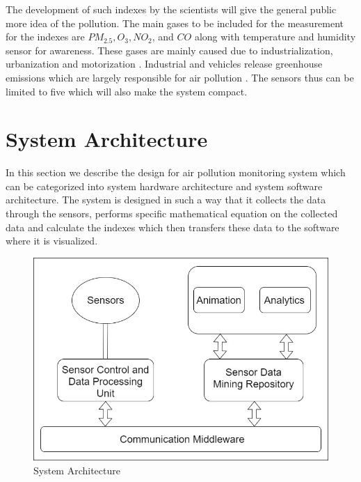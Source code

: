 The development of such indexes by the scientists will give the general public more idea of the pollution. The main gases to be included for the measurement for the indexes are  $PM_{2.5}, O_3, NO_2$, and $CO$ along with temperature and humidity sensor for awareness. These gases are mainly caused due to industrialization, urbanization and motorization \cite{Saha1952}. Industrial and vehicles release greenhouse emissions which are largely responsible for air pollution \cite{ internet}. The sensors thus can be limited to five which will also make the system compact.

\section{System Architecture}
    
     In this section we describe the design for air pollution monitoring system which can be categorized into system hardware architecture and system software architecture. The system is designed in such a way that it collects the data through the sensors, performs specific mathematical equation on the collected data and calculate the indexes which then transfers these data to the software where it is visualized. 

     \begin{figure}[h]
      \begin{center}
      \includegraphics[scale=0.70]{images/figure2.png}
      \end{center}
      \caption{System Architecture}
      \label{overview}
  
    \end{figure}

